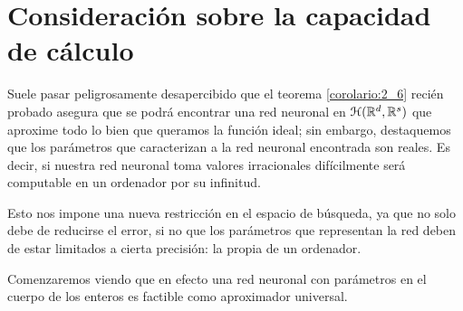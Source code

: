 \section{Consideración sobre la capacidad de cálculo}

Suele pasar peligrosamente desapercibido que el teorema  \ref{corolario:2_6} recién probado asegura
que se podrá encontrar una red neuronal en $\mathcal{H}(\mathbb{R}^d,\mathbb{R}^s)$
que aproxime todo lo bien que queramos la función ideal; sin embargo, destaquemos que los parámetros que caracterizan a la red neuronal encontrada son reales. Es decir, 
si nuestra red neuronal toma valores irracionales difícilmente será computable en un ordenador por su infinitud. 

Esto nos impone una nueva restricción en el espacio de búsqueda, ya que no solo debe de reducirse el error, si no que los parámetros que representan la red deben de estar limitados a cierta precisión: la propia de un ordenador.  

Comenzaremos viendo que en efecto una red neuronal con parámetros en el cuerpo de los enteros es factible como aproximador universal. 

